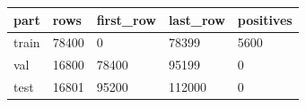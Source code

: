 \begin{tabular}{lllll}
\toprule
part & rows & first\_row & last\_row & positives \\
\midrule
train & 78400 & 0 & 78399 & 5600 \\
val & 16800 & 78400 & 95199 & 0 \\
test & 16801 & 95200 & 112000 & 0 \\
\bottomrule
\end{tabular}
